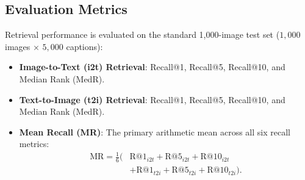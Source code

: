 \documentclass[conference]{IEEEtran}
\begin{document}
\subsection{Evaluation Metrics}
Retrieval performance is evaluated on the standard 1,000-image test set ($1,000$ images $\times$ $5,000$ captions):
\begin{itemize}
    \item \textbf{Image-to-Text (i2t) Retrieval}: Recall@1, Recall@5, Recall@10, and Median Rank (MedR).
    \item \textbf{Text-to-Image (t2i) Retrieval}: Recall@1, Recall@5, Recall@10, and Median Rank (MedR).
    \item \textbf{Mean Recall (MR)}: The primary arithmetic mean across all six recall metrics:
    \begin{equation}
    \label{eq:mean_recall}
    \begin{aligned}
    \mathrm{MR} = \frac{1}{6} \Big( &\mathrm{R@1}_{i2t} + \mathrm{R@5}_{i2t} + \mathrm{R@10}_{i2t} \\
    &+ \mathrm{R@1}_{t2i} + \mathrm{R@5}_{t2i} + \mathrm{R@10}_{t2i} \Big).
    \end{aligned}
    \end{equation}
\end{itemize}
\end{document}
